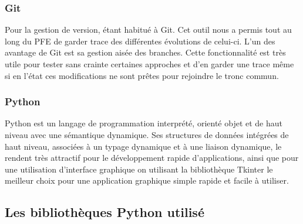 \documentclass[a4paper]{report}
\begin{document}
\subsubsection{Git}
Pour la gestion de version, étant habitué à Git. Cet outil nous a permis tout au long du PFE de garder trace des différentes évolutions de celui-ci. L’un des avantage de Git est sa gestion aisée des branches. Cette fonctionnalité est très utile pour tester sans crainte certaines approches et d’en garder une trace même si en l’état ces modifications ne sont prêtes pour rejoindre le tronc commun.
\subsubsection{Python}
Python est un langage de programmation interprété, orienté objet et de haut niveau avec une sémantique dynamique. Ses structures de données intégrées de haut niveau, associées à un typage dynamique et à une liaison dynamique, le rendent très attractif pour le développement rapide d'applications, ainsi que pour une utilisation d'interface graphique on utilisant la bibliothèque Tkinter le meilleur choix pour une application graphique simple rapide et facile à utiliser.\newpage
\subsection{Les bibliothèques Python utilisé}
\end{document}
